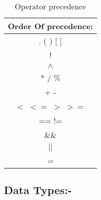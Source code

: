 \documentclass[11pt]{article}
\begin{document}
\begin{table}[H]
    \centering
    \begin{tabular}{|c|}
    \hline
    \textbf{Order Of precedence:}\\
    \hline
. ( ) [ ]\\
\hline
 !\\
\hline
  $\wedge$ \\
\hline
* / \%\\
\hline
+ -\\
\hline
$<$ $<=$  $>$ $>=$\\
\hline
== !=\\
\hline
\&\& \\
\hline
$||$ \\
\hline
  =\\

\hline


    \end{tabular}
    \caption{Operator precedence}
    \label{operator precedence}
\end{table}




\subsection{Data Types:-}
\end{document}
